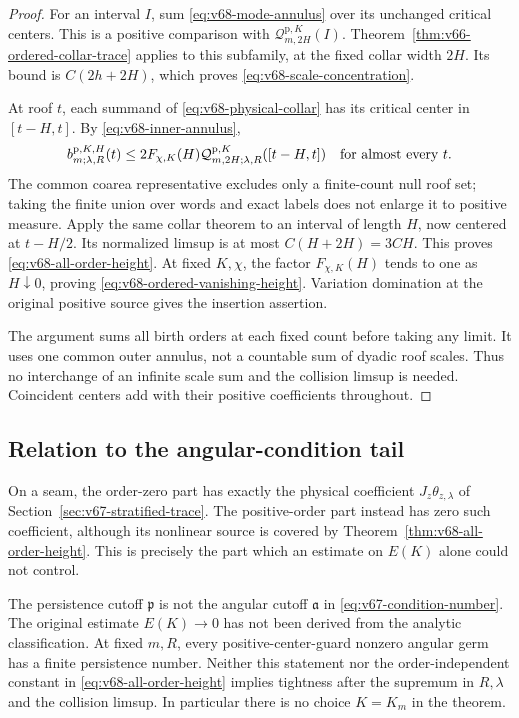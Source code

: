\begin{proof}
For an interval $I$, sum \eqref{eq:v68-mode-annulus} over its unchanged
critical centers. This is a positive comparison with
$\mathcal Q^{\mathrm p,K}_{m,2H}(I)$. Theorem~\ref{thm:v66-ordered-collar-trace}
applies to this subfamily, at the fixed collar width $2H$. Its bound
is $C(2h+2H)$, which proves
\eqref{eq:v68-scale-concentration}.

At roof $t$, each summand of \eqref{eq:v68-physical-collar} has its
critical center in $[t-H,t]$. By \eqref{eq:v68-inner-annulus},
\begin{equation}\label{eq:v68-finite-count-height-comparison}
 b^{\mathrm p,K,H}_{m;\lambda,R}(t)
       \le2F_{\chi,K}(H)
           \mathcal Q^{\mathrm p,K}_{m,2H;\lambda,R}([t-H,t])
                   \quad\hbox{for almost every }t.
\end{equation}
The common coarea representative excludes only a finite-count null
roof set; taking the finite union over words and exact labels does
not enlarge it to positive measure. Apply the same collar theorem to
an interval of length $H$, now centered at $t-H/2$. Its normalized
limsup is at most $C(H+2H)=3CH$. This proves
\eqref{eq:v68-all-order-height}. At fixed $K,\chi$, the factor
$F_{\chi,K}(H)$ tends to one as $H\downarrow0$, proving
\eqref{eq:v68-ordered-vanishing-height}. Variation domination at the
original positive source gives the insertion assertion.

The argument sums all birth orders at each fixed count before taking
any limit. It uses one common outer annulus, not a countable sum of
dyadic roof scales. Thus no interchange of an infinite scale sum and
the collision limsup is needed. Coincident centers add with their
positive coefficients throughout.
\end{proof}

\subsection{Relation to the angular-condition tail}
On a seam, the order-zero part has exactly the physical coefficient
$J_z\theta_{z,\lambda}$ of Section~\ref{sec:v67-stratified-trace}.
The positive-order part instead has zero such coefficient, although
its nonlinear source is covered by
Theorem~\ref{thm:v68-all-order-height}. This is precisely the part
which an estimate on $E(K)$ alone could not control.

The persistence cutoff $\mathfrak p$ is not the angular cutoff
$\mathfrak a$ in \eqref{eq:v67-condition-number}. The original
estimate $E(K)\to0$ has not been derived from the analytic
classification. At fixed $m,R$, every positive-center-guard nonzero
angular germ has a finite persistence number. Neither this statement
nor the order-independent constant in
\eqref{eq:v68-all-order-height} implies tightness after the supremum
in $R,\lambda$ and the collision limsup. In particular there is no
choice $K=K_m$ in the theorem.

